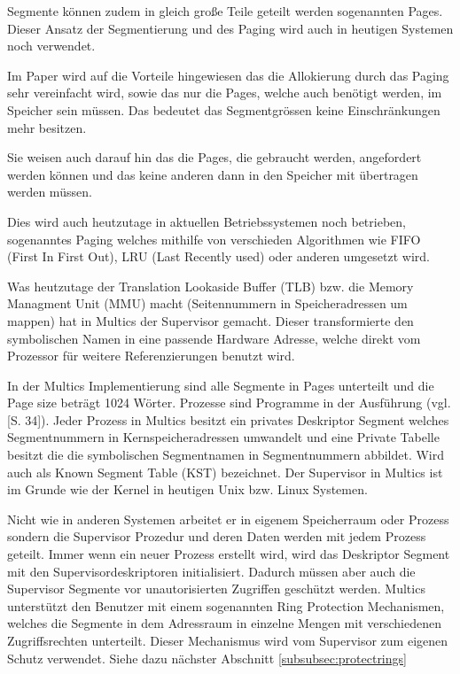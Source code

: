 \documentclass[11pt,technote]{IEEEtran}
\begin{document}
	      Segmente k\"onnen zudem in gleich gro\ss e Teile geteilt werden sogenannten Pages. Dieser Ansatz der Segmentierung
	      und des Paging wird auch in heutigen Systemen noch verwendet.
	     
	      Im Paper \cite{inproc:multics} wird auf die Vorteile hingewiesen das die Allokierung durch das Paging sehr vereinfacht wird,
	      sowie das nur die Pages, welche auch ben\"otigt werden, im Speicher sein m\"ussen. 
	      Das bedeutet das Segmentgr\"ossen keine Einschr\"ankungen mehr besitzen.
	     
	      Sie weisen auch darauf hin das die Pages, die gebraucht werden, angefordert werden k\"onnen und das keine anderen dann in 
	      den Speicher mit \"ubertragen werden m\"ussen.
	     
	      Dies wird auch heutzutage in aktuellen Betriebssystemen noch betrieben, sogenanntes Paging welches mithilfe von
	      verschieden Algorithmen wie FIFO (First In First Out), LRU (Last Recently used) oder anderen umgesetzt wird.
	 
	      Was heutzutage der Translation Lookaside Buffer (TLB) bzw. die Memory Managment Unit (MMU) macht
	      (Seitennummern in Speicheradressen um mappen) hat in Multics der Supervisor gemacht.
	      Dieser transformierte den symbolischen Namen in eine passende Hardware Adresse, welche direkt vom Prozessor f\"ur weitere Referenzierungen benutzt wird.
	 
	      In der Multics Implementierung sind alle Segmente in Pages unterteilt und die Page size betr\"agt 1024 W\"orter.
        Prozesse sind Programme in der Ausf\"uhrung (vgl. \cite{inproc:multics}[S. 34]). 
		    Jeder Prozess in Multics besitzt ein privates Deskriptor Segment welches Segmentnummern in Kernspeicheradressen umwandelt und eine Private Tabelle besitzt   
		    die die symbolischen Segmentnamen in Segmentnummern abbildet. Wird auch als Known Segment Table (KST) bezeichnet.
		    Der Supervisor in Multics ist im Grunde wie der Kernel in heutigen Unix bzw. Linux Systemen.
		   
      Nicht wie in anderen Systemen arbeitet er in eigenem Speicherraum oder Prozess sondern die Supervisor Prozedur und deren Daten werden mit jedem Prozess
    	  geteilt. Immer wenn ein neuer Prozess erstellt wird, wird das Deskriptor Segment mit den Supervisordeskriptoren initialisiert.
    	  Dadurch m\"ussen aber auch die Supervisor Segmente vor unautorisierten Zugriffen gesch\"utzt werden.
    	  Multics unterst\"utzt den Benutzer mit einem sogenannten Ring Protection Mechanismen, welches die Segmente in dem Adressraum in einzelne Mengen mit 
    		verschiedenen Zugriffsrechten unterteilt. Dieser Mechanismus wird vom Supervisor zum eigenen Schutz verwendet. Siehe dazu n\"achster Abschnitt 
    		\ref{subsubsec:protectrings}
    		
\end{document}
